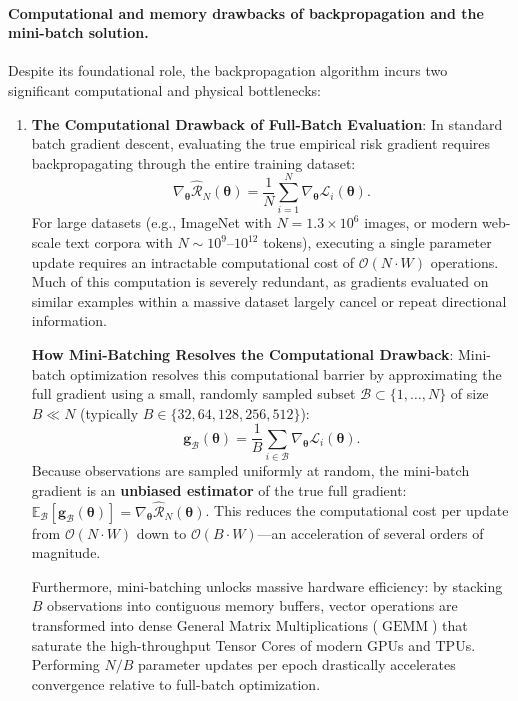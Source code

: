 \paragraph{Computational and memory drawbacks of backpropagation and the mini-batch solution.}
Despite its foundational role, the backpropagation algorithm incurs two significant computational and physical bottlenecks:
\begin{enumerate}[noitemsep,topsep=2pt,parsep=0pt,partopsep=0pt]
  \item \textbf{The Computational Drawback of Full-Batch Evaluation}:
  In standard batch gradient descent, evaluating the true empirical risk gradient requires backpropagating through the entire training dataset:
  \begin{equation}
  \nabla_{\boldsymbol{\theta}} \hat{\mathcal{R}}_N(\boldsymbol{\theta}) = \frac{1}{N} \sum_{i=1}^N \nabla_{\boldsymbol{\theta}} \mathcal{L}_i(\boldsymbol{\theta}).
  \end{equation}
  For large datasets (e.g., ImageNet with $N = 1.3 \times 10^6$ images, or modern web-scale text corpora with $N \sim 10^9$--$10^{12}$ tokens), executing a single parameter update requires an intractable computational cost of $\mathcal{O}(N \cdot W)$ operations. Much of this computation is severely redundant, as gradients evaluated on similar examples within a massive dataset largely cancel or repeat directional information.

  \textbf{How Mini-Batching Resolves the Computational Drawback}:
  Mini-batch optimization resolves this computational barrier by approximating the full gradient using a small, randomly sampled subset $\mathcal{B} \subset \{1, \dots, N\}$ of size $B \ll N$ (typically $B \in \{32, 64, 128, 256, 512\}$):
  \begin{equation}
  \mathbf{g}_{\mathcal{B}}(\boldsymbol{\theta}) = \frac{1}{B} \sum_{i \in \mathcal{B}} \nabla_{\boldsymbol{\theta}} \mathcal{L}_i(\boldsymbol{\theta}).
  \end{equation}
  Because observations are sampled uniformly at random, the mini-batch gradient is an \textbf{unbiased estimator} of the true full gradient: $\mathbb{E}_{\mathcal{B}}[\mathbf{g}_{\mathcal{B}}(\boldsymbol{\theta})] = \nabla_{\boldsymbol{\theta}} \hat{\mathcal{R}}_N(\boldsymbol{\theta})$. This reduces the computational cost per update from $\mathcal{O}(N \cdot W)$ down to $\mathcal{O}(B \cdot W)$---an acceleration of several orders of magnitude. 
  
  Furthermore, mini-batching unlocks massive hardware efficiency: by stacking $B$ observations into contiguous memory buffers, vector operations are transformed into dense General Matrix Multiplications ($\operatorname{GEMM}$) that saturate the high-throughput Tensor Cores of modern GPUs and TPUs. Performing $N/B$ parameter updates per epoch drastically accelerates convergence relative to full-batch optimization.


\end{enumerate}
